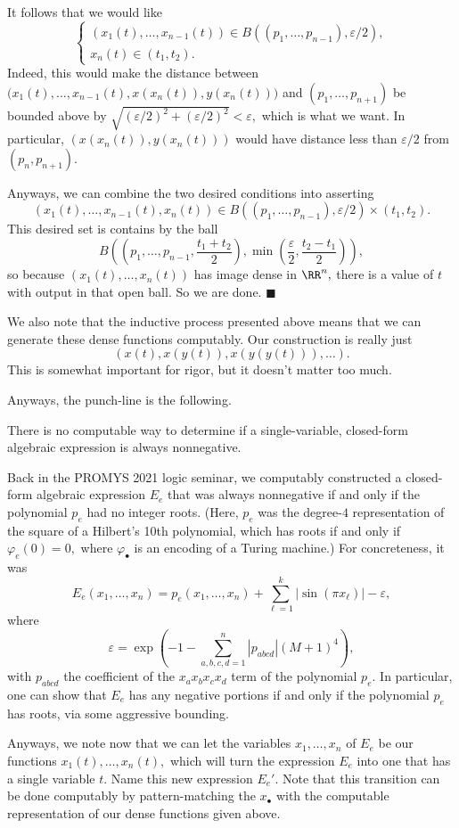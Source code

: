 It follows that we would like
\[\begin{cases}
    (x_1(t),\ldots,x_{n-1}(t))\in B((p_1,\ldots,p_{n-1}),\varepsilon/2), \\
    x_n(t)\in(t_1,t_2).
\end{cases}\]
Indeed, this would make the distance between $\big(x_1(t),\ldots,x_{n-1}(t),x(x_n(t)),y(x_n(t))\big)$ and $(p_1,\ldots,p_{n+1})$ be bounded above by $\sqrt{(\varepsilon/2)^2+(\varepsilon/2)^2}<\varepsilon,$ which is what we want. In particular, $(x(x_n(t)),y(x_n(t)))$ would have distance less than $\varepsilon/2$ from $(p_n,p_{n+1}).$

Anyways, we can combine the two desired conditions into asserting
\[(x_1(t),\ldots,x_{n-1}(t),x_n(t))\in B((p_1,\ldots,p_{n-1}),\varepsilon/2)\times(t_1,t_2).\]
This desired set is contains by the ball
\[B\left(\left(p_1,\ldots,p_{n-1},\frac{t_1+t_2}2\right),\min\left(\frac\varepsilon2,\frac{t_2-t_1}2\right)\right),\]
so because $(x_1(t),\ldots,x_n(t))$ has image dense in $\RR^n,$ there is a value of $t$ with output in that open ball. So we are done. $\blacksquare$

We also note that the inductive process presented above means that we can generate these dense functions computably. Our construction is really just
\[(x(t),x(y(t)),x(y(y(t))),\ldots).\]
This is somewhat important for rigor, but it doesn't matter too much.

Anyways, the punch-line is the following.
\begin{theorem}
    There is no computable way to determine if a single-variable, closed-form algebraic expression is always nonnegative.
\end{theorem}
Back in the PROMYS 2021 logic seminar, we computably constructed a closed-form algebraic expression $E_e$ that was always nonnegative if and only if the polynomial $p_e$ had no integer roots. (Here, $p_e$ was the degree-$4$ representation of the square of a Hilbert's 10th polynomial, which has roots if and only if $\varphi_e(0)=0,$ where $\varphi_\bullet$ is an encoding of a Turing machine.) For concreteness, it was
\[E_e(x_1,\ldots,x_n)=p_e(x_1,\ldots,x_n)+\sum_{\ell=1}^k|\sin(\pi x_\ell)|-\varepsilon,\]
where
\[\varepsilon=\exp\left(-1-\sum_{a,b,c,d=1}^n|p_{abcd}|(M+1)^4\right),\]
with $p_{abcd}$ the coefficient of the $x_ax_bx_cx_d$ term of the polynomial $p_e.$ In particular, one can show that $E_e$ has any negative portions if and only if the polynomial $p_e$ has roots, via some aggressive bounding.

Anyways, we note now that we can let the variables $x_1,\ldots,x_n$ of $E_e$ be our functions $x_1(t),\ldots,x_n(t),$ which will turn the expression $E_e$ into one that has a single variable $t.$ Name this new expression $E_e'.$ Note that this transition can be done computably by pattern-matching the $x_\bullet$ with the computable representation of our dense functions given above.

